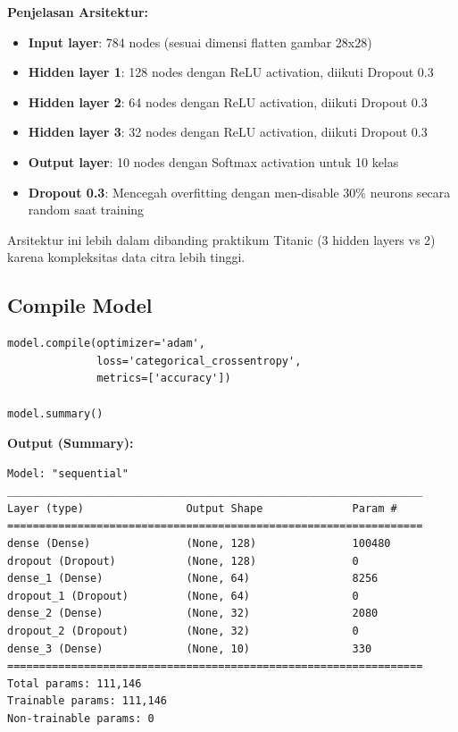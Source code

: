 \documentclass[12pt,a4paper]{article}
\begin{document}
\textbf{Penjelasan Arsitektur:}
\begin{itemize}
    \item \textbf{Input layer}: 784 nodes (sesuai dimensi flatten gambar 28x28)
    \item \textbf{Hidden layer 1}: 128 nodes dengan ReLU activation, diikuti Dropout 0.3
    \item \textbf{Hidden layer 2}: 64 nodes dengan ReLU activation, diikuti Dropout 0.3
    \item \textbf{Hidden layer 3}: 32 nodes dengan ReLU activation, diikuti Dropout 0.3
    \item \textbf{Output layer}: 10 nodes dengan Softmax activation untuk 10 kelas
    \item \textbf{Dropout 0.3}: Mencegah overfitting dengan men-disable 30\% neurons secara random saat training
\end{itemize}

Arsitektur ini lebih dalam dibanding praktikum Titanic (3 hidden layers vs 2) karena kompleksitas data citra lebih tinggi.

\subsection{Compile Model}

\begin{lstlisting}[caption=Compile Model]
model.compile(optimizer='adam', 
              loss='categorical_crossentropy', 
              metrics=['accuracy'])

model.summary()
\end{lstlisting}

\textbf{Output (Summary):}
\begin{verbatim}
Model: "sequential"
_________________________________________________________________
Layer (type)                Output Shape              Param #   
=================================================================
dense (Dense)               (None, 128)               100480    
dropout (Dropout)           (None, 128)               0         
dense_1 (Dense)             (None, 64)                8256      
dropout_1 (Dropout)         (None, 64)                0         
dense_2 (Dense)             (None, 32)                2080      
dropout_2 (Dropout)         (None, 32)                0         
dense_3 (Dense)             (None, 10)                330       
=================================================================
Total params: 111,146
Trainable params: 111,146
Non-trainable params: 0
\end{verbatim}
\end{document}
